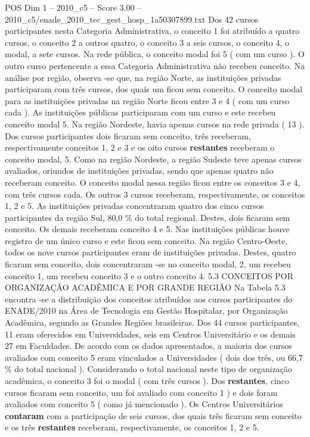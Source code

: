 \begin{textsample}{POS Dim 1 – 2010\_c5 – Score 3.00 – 2010\_c5/enade\_2010\_tec\_gest\_hosp\_1a50307899.txt}
Dos 42 cursos participantes nesta Categoria Administrativa, o conceito 1 foi atribuído a quatro cursos, o conceito 2 a outros quatro, o conceito 3 a seis cursos, o conceito 4, o modal, a sete cursos.
Na rede pública, o conceito modal foi 5 ( com um curso ).
O outro curso pertencente a essa Categoria Administrativa não recebeu conceito.
Na análise por região, observa -se que, na região Norte, as instituições privadas participaram com três cursos, dos quais um ficou sem conceito.
O conceito modal para as instituições privadas na região Norte ficou entre 3 e 4 ( com um curso cada ).
As instituições públicas participaram com um curso e este recebeu conceito modal 5.
Na região Nordeste, havia apenas cursos na rede privada ( 13 ).
Dos cursos participantes dois ficaram sem conceito, três receberam, respectivamente conceitos 1, 2 e 3 e os oito cursos \textbf{restantes} receberam o conceito modal, 5.
Como na região Nordeste, a região Sudeste teve apenas cursos avaliados, oriundos de instituições privadas, sendo que apenas quatro não receberam conceito.
O conceito modal nessa região ficou entre os conceitos 3 e 4, com três cursos cada.
Os outros 3 cursos receberam, respectivamente, os conceitos 1, 2 e 5.
As instituições privadas concentraram quatro dos cinco cursos participantes da região Sul, 80,0 \% do total regional.
Destes, dois ficaram sem conceito.
Os demais receberam conceito 4 e 5.
Nas instituições públicas houve registro de um único curso e este ficou sem conceito.
Na região Centro-Oeste, todos os nove cursos participantes eram de instituições privadas.
Destes, quatro ficaram sem conceito, dois concentraram -se no conceito modal, 2, um recebeu conceito 1, um recebeu conceito 3 e o outro conceito 4. 5.3 CONCEITOS POR ORGANIZAÇÃO ACADÊMICA E POR GRANDE REGIÃO Na Tabela 5.3 encontra -se a distribuição dos conceitos atribuídos aos cursos participantes do ENADE/2010 na Área de Tecnologia em Gestão Hospitalar, por Organização Acadêmica, segundo as Grandes Regiões brasileiras.
Dos 44 cursos participantes, 11 eram oferecidos em Universidades, seis em Centros Universitário e os demais 27 em Faculdades.
De acordo com os dados apresentados, a maioria dos cursos avaliados com conceito 5 eram vinculados a Universidades ( dois dos três, ou 66,7 \% do total nacional ).
Considerando o total nacional neste tipo de organização acadêmica, o conceito 3 foi o modal ( com três cursos ).
Dos \textbf{restantes}, cinco cursos ficaram sem conceito, um foi avaliado com conceito 1 ) e dois foram avaliados com conceito 5 ( como já mencionado ).
Os Centros Universitários \textbf{contaram} com a participação de seis cursos, dos quais três ficaram sem conceito e os três \textbf{restantes} receberam, respectivamente, os conceitos 1, 2 e 5.

\end{textsample}
